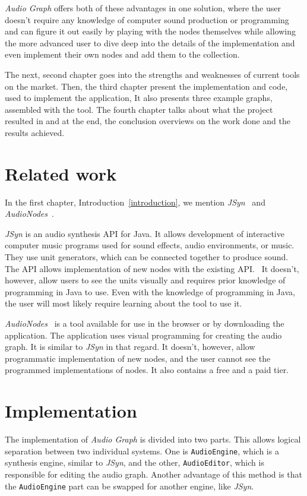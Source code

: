 \documentclass[conference]{IEEEtran}
\begin{document}
\textit{Audio Graph} offers both of these advantages in one solution, where the user doesn't require any knowledge of computer sound production or programming and can figure it out easily by playing with the nodes themselves while allowing the more advanced user to dive deep into the details of the implementation and even implement their own nodes and add them to the collection.

The next, second chapter goes into the strengths and weaknesses of current tools on the market. Then, the third chapter present the implementation and code, used to implement the application, It also presents three example graphs, assembled with the tool. The fourth chapter talks about what the project resulted in and at the end, the conclusion overviews on the work done and the results achieved.

\section{Related work}
In the first chapter, Introduction~\ref{introduction}, we mention \textit{JSyn}~\cite{jsyn} and \textit{AudioNodes}~\cite{audionodes}.

\textit{JSyn} is an audio synthesis API for Java. It allows development of interactive computer music programs used for sound effects, audio environments, or music. They use unit generators, which can be connected together to produce sound. The API allows implementation of new nodes with the existing API.~\cite{jsyn}
It doesn't, however, allow users to see the units visually and requires prior knowledge of programming in Java to use. Even with the knowledge of programming in Java, the user will most likely require learning about the tool to use it.

\textit{AudioNodes}~\cite{audionodes} is a tool available for use in the browser or by downloading the application. The application uses visual programming for creating the audio graph. It is similar to \textit{JSyn} in that regard. It doesn't, however, allow programmatic implementation of new nodes, and the user cannot see the programmed implementations of nodes. It also contains a free and a paid tier.

\section{Implementation}
The implementation of \textit{Audio Graph} is divided into two parts. This allows logical separation between two individual systems. One is \texttt{AudioEngine}, which is a synthesis engine, similar to \textit{JSyn}, and the other, \texttt{AudioEditor}, which is responsible for editing the audio graph. Another advantage of this method is that the \texttt{AudioEngine} part can be swapped for another engine, like \textit{JSyn}.
\end{document}
